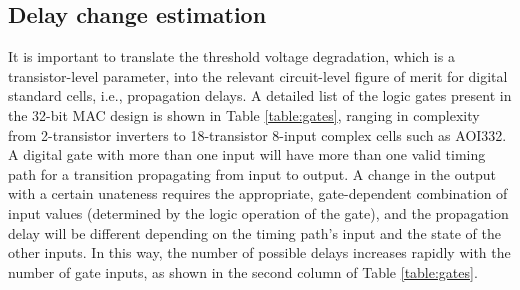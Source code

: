 \subsection{Delay change estimation}

It is important to translate the threshold voltage degradation, which is a transistor-level parameter, into the relevant circuit-level figure of merit for digital standard cells, i.e., propagation delays. A detailed list of the logic gates present in the 32-bit MAC design is shown in Table \ref{table:gates}, ranging in complexity from 2-transistor inverters to 18-transistor 8-input complex cells such as AOI332. A digital gate with more than one input will have more than one valid timing path for a transition propagating from input to output. A change in the output with a certain unateness requires the appropriate, gate-dependent combination of input values (determined by the logic operation of the gate), and the propagation delay will be different depending on the timing path's input and the state of the other inputs. In this way, the number of possible delays increases rapidly with the number of gate inputs, as shown in the second column of Table \ref{table:gates}. 

